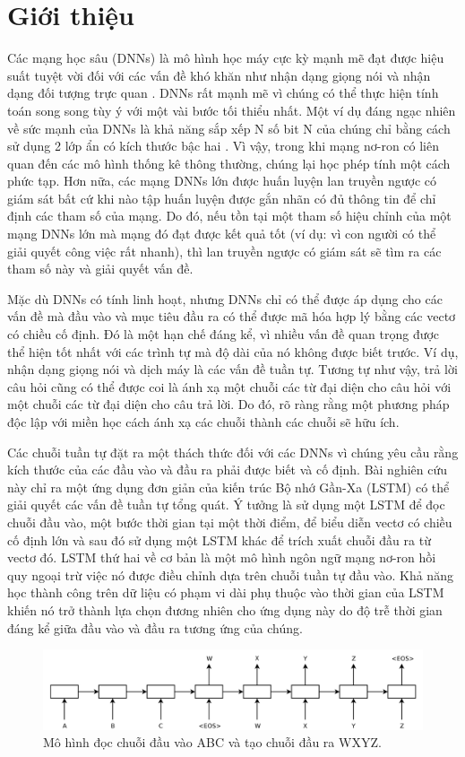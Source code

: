 \section{Giới thiệu}
Các mạng học sâu (DNNs) là mô hình học máy cực kỳ mạnh mẽ đạt được hiệu suất tuyệt vời đối với các vấn đề khó khăn như nhận dạng giọng nói \citep{hinton2012deep, DBLP:journals/taslp/DahlYDA12} và nhận dạng đối tượng trực quan \citep{DBLP:journals/cacm/KrizhevskySH17, DBLP:conf/cvpr/CiresanMS12, lecun1998gradient, LeRMDCCDN12}. DNNs rất mạnh mẽ vì chúng có thể thực hiện tính toán song song tùy ý với một vài bước tối thiểu nhất. Một ví dụ đáng ngạc nhiên về sức mạnh của DNNs là khả năng sắp xếp N số bit N của chúng chỉ bằng cách sử dụng 2 lớp ẩn có kích thước bậc hai \citep{DBLP:conf/swat/Razborov92}. Vì vậy, trong khi mạng nơ-ron có liên quan đến các mô hình thống kê thông thường, chúng lại học phép tính một cách phức tạp. Hơn nữa, các mạng DNNs lớn được huấn luyện lan truyền ngược có giám sát bất cứ khi nào tập huấn luyện được gắn nhãn có đủ thông tin để chỉ định các tham số của mạng. Do đó, nếu tồn tại một tham số hiệu chỉnh của một mạng DNNs lớn mà mạng đó đạt được kết quả tốt (ví dụ: vì con người có thể giải quyết công việc rất nhanh), thì lan truyền ngược có giám sát sẽ tìm ra các tham số này và giải quyết vấn đề.

Mặc dù DNNs có tính linh hoạt, nhưng DNNs chỉ có thể được áp dụng cho các vấn đề mà đầu vào và mục tiêu đầu ra có thể được mã hóa hợp lý bằng các vectơ có chiều cố định. Đó là một hạn chế đáng kể, vì nhiều vấn đề quan trọng được thể hiện tốt nhất với các trình tự mà độ dài của nó không được biết trước. Ví dụ, nhận dạng giọng nói và dịch máy là các vấn đề tuần tự. Tương tự như vậy, trả lời câu hỏi cũng có thể được coi là ánh xạ một chuỗi các từ đại diện cho câu hỏi với một chuỗi các từ đại diện cho câu trả lời. Do đó, rõ ràng rằng một phương pháp độc lập với miền học cách ánh xạ các chuỗi thành các chuỗi sẽ hữu ích.

Các chuỗi tuần tự đặt ra một thách thức đối với các DNNs vì chúng yêu cầu rằng kích thước của các đầu vào và đầu ra phải được biết và cố định. Bài nghiên cứu này chỉ ra một ứng dụng đơn giản của kiến trúc Bộ nhớ Gần-Xa (LSTM) \citep{HochreiterandSchmidhuber1997} có thể giải quyết các vấn đề tuần tự tổng quát. Ý tưởng là sử dụng một LSTM để đọc chuỗi đầu vào, một bước thời gian tại một thời điểm, để biểu diễn vectơ có chiều cố định lớn và sau đó sử dụng một LSTM khác để trích xuất chuỗi đầu ra từ vectơ đó. LSTM thứ hai về cơ bản là một mô hình ngôn ngữ mạng nơ-ron hồi quy \citep{Mikolov2010} ngoại trừ việc nó được điều chỉnh dựa trên chuỗi tuần tự đầu vào. Khả năng học thành công trên dữ liệu có phạm vi dài phụ thuộc vào thời gian của LSTM khiến nó trở thành lựa chọn đương nhiên cho ứng dụng này do độ trễ thời gian đáng kể giữa đầu vào và đầu ra tương ứng của chúng.

\begin{figure}
	\centering
	\includegraphics[scale=0.3]{img/fig1.png}
	\caption{Mô hình đọc chuỗi đầu vào ABC và tạo chuỗi đầu ra WXYZ.}
	\label{fig_1}
\end{figure}
